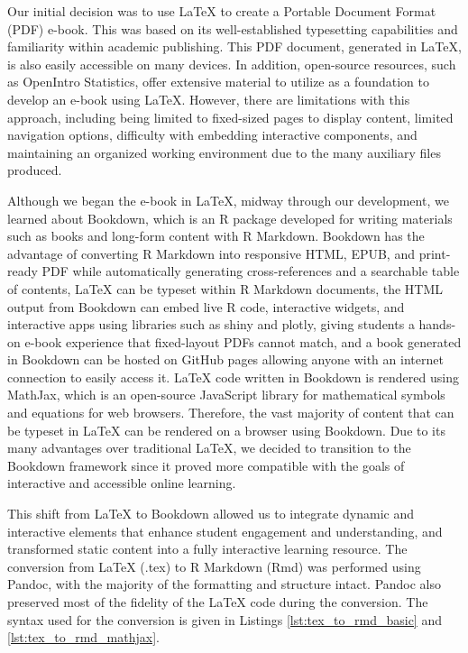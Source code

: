 \documentclass[11pt]{article}
\begin{document}
Our initial decision was to use LaTeX to create a Portable Document Format (PDF) e-book.
This was based on its well-established typesetting capabilities and familiarity within academic publishing.
This PDF document, generated in LaTeX, is also easily accessible on many devices.
In addition, open-source resources, such as OpenIntro Statistics, offer extensive material to utilize as a foundation to develop an e-book using LaTeX.
However, there are limitations with this approach, including being limited to fixed-sized pages to display content, limited navigation options, difficulty with embedding interactive components, and maintaining an organized working environment due to the many auxiliary files produced.

Although we began the e-book in LaTeX, midway through our development, we learned about Bookdown, which is an R package developed for writing materials such as books and long-form content with R Markdown. 
Bookdown has the advantage of converting R Markdown into responsive HTML, EPUB, and print-ready PDF while automatically generating cross-references and a searchable table of contents, LaTeX can be typeset within R Markdown documents, the HTML output from Bookdown can embed live R code, interactive widgets, and interactive apps using libraries such as shiny and plotly, giving students a hands-on e-book experience that fixed-layout PDFs cannot match, and a book generated in Bookdown can be hosted on GitHub pages allowing anyone with an internet connection to easily access it.
LaTeX code written in Bookdown is rendered using MathJax, which is an open-source JavaScript library for mathematical symbols and equations for web browsers.
Therefore, the vast majority of content that can be typeset in LaTeX can be rendered on a browser using Bookdown.
Due to its many advantages over traditional LaTeX, we decided to transition to the Bookdown framework since it proved more compatible with the goals of interactive and accessible online learning. 

This shift from LaTeX to Bookdown allowed us to integrate dynamic and interactive elements that enhance student engagement and understanding, and
transformed static content into a fully interactive learning resource.
The conversion from LaTeX (.tex) to R Markdown (Rmd) was performed using Pandoc, with the majority of the formatting and structure intact. Pandoc also preserved most of the fidelity of the LaTeX code during the conversion. 
The syntax used for the conversion is given in Listings \ref{lst:tex_to_rmd_basic} and \ref{lst:tex_to_rmd_mathjax}.\\
\end{document}
